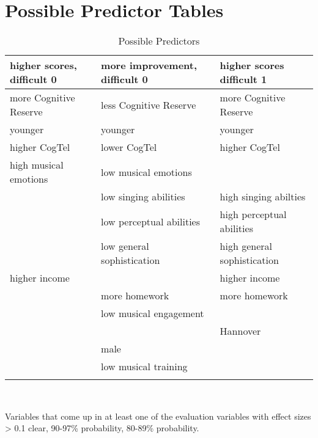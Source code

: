 \section{Possible Predictor Tables}
\begin{table}[!ht]
	\centering
	\caption{Possible Predictors}
	\label{tab:preds}
	\vspace{\medskipamount}
	\renewcommand{\arraystretch}{1.2}
	\begin{tabular}{l|l|l}
		higher scores, difficult 0 & more improvement, difficult 0 & higher scores difficult 1 \\ \hline
		\colorbox{rwthyellow}{more Cognitive Reserve} & \colorbox{rwthyellow}{less Cognitive Reserve} & \colorbox{rwthyellow}{more Cognitive Reserve} \\
		
		\colorbox{rwthyellow}{younger}& \colorbox{rwthyellow}{younger} & \colorbox{rwthgreen}{younger}  \\ 
		
		\colorbox{rwthyellow}{higher CogTel} & lower CogTel & \colorbox{rwthgreen}{higher CogTel} \\ 
		\colorbox{rwthyellow}{high musical emotions} & \colorbox{rwthyellow}{low musical emotions}&\\		
		& \colorbox{rwthyellow}{low singing abilities} & \colorbox{rwthgreen}{high singing abilties}\\
		& low perceptual abilities & \colorbox{rwthyellow}{high perceptual abilities}  \\  
		& \colorbox{rwthyellow}{low general sophistication} & high general sophistication\\
		\colorbox{rwthyellow}{higher income}&  & higher income\\ 
		& more homework & \colorbox{rwthgreen}{more homework} \\  
		& \colorbox{rwthyellow}{low musical engagement}& \\ 
		&  & \colorbox{rwthgreen}{Hannover} \\
		& male &  \\ 
		& low musical training & \\\addlinespace
		\bottomrule[0.1pt]\addlinespace[2pt]
	\end{tabular} \\\par
	Variables that come up in at least one of the evaluation variables with effect sizes > 0.1 \colorbox{rwthyellow}{clear}, \colorbox{rwthgreen}{90-97\% probability}, 80-89\% probability.
\end{table}